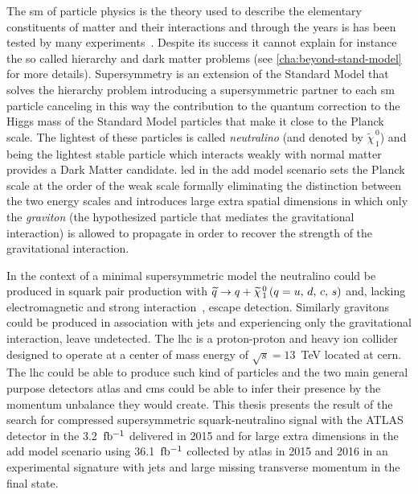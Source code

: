 The \gls{sm} of particle physics is the theory used to describe the elementary
constituents of matter and their interactions and through the years is has been
tested by many experiments~\cite{SMTests}. Despite its success it cannot explain
for instance the so called hierarchy and dark matter problems (see
\cref{cha:beyond-stand-model} for more details). Supersymmetry is an extension
of the Standard Model that solves the hierarchy problem introducing a
supersymmetric partner to each \gls{sm} particle canceling in this way the
contribution to the quantum correction to the Higgs mass of the Standard Model
particles that make it close to the Planck scale. The lightest of these
particles is called \emph{neutralino} (and denoted by
$\widetilde{\chi}_{\, 1}^{\, 0}$) and being the lightest stable particle which
interacts weakly with normal matter provides a Dark Matter candidate. \gls{led}
in the \gls{add} model scenario sets the Planck scale at the order of the weak
scale formally eliminating the distinction between the two energy scales and
introduces large extra spatial dimensions in which only the \emph{graviton} (the
hypothesized particle that mediates the gravitational interaction) is allowed to
propagate in order to recover the strength of the gravitational interaction.

In the context of a minimal supersymmetric model the neutralino could be
produced in squark pair production with $\widetilde{q} \rightarrow q + \widetilde{\chi}_{\, 1}^{\, 0}\, (q = u,\, d,\, c,\, s)$ and, lacking
electromagnetic and strong interaction~\cite{MSSMIntro}, escape
detection. Similarly gravitons could be produced in association with jets and
experiencing only the gravitational interaction, leave undetected. The \gls{lhc}
is a proton-proton and heavy ion collider designed to operate at a center of
mass energy of $\sqrt{s} = 13$~TeV located at \gls{cern}. The \gls{lhc} could be
able to produce such kind of particles and the two main general purpose
detectors \gls{atlas} and \gls{cms} could be able to infer their presence by the
momentum unbalance they would create. This thesis presents the result of the
search for compressed supersymmetric squark-neutralino signal with the ATLAS
detector in the 3.2~$\mbox{fb$^{-1}$}$ delivered in 2015 and for large extra dimensions in
the \gls{add} model scenario using 36.1~$\mbox{fb$^{-1}$}$ collected by \gls{atlas} in 2015
and 2016 in an experimental signature with jets and large missing transverse
momentum in the final state.
